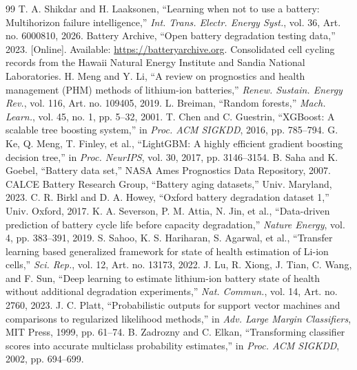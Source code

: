 \raggedbottom
\begin{thebibliography}{99}
 T. A. Shikdar and H. Laaksonen, ``Learning when not to use a battery: Multihorizon failure intelligence,'' \emph{Int. Trans. Electr. Energy Syst.}, vol. 36, Art. no. 6000810, 2026.
 Battery Archive, ``Open battery degradation testing data,'' 2023. [Online]. Available: \url{https://batteryarchive.org}. Consolidated cell cycling records from the Hawaii Natural Energy Institute and Sandia National Laboratories.
 H. Meng and Y. Li, ``A review on prognostics and health management (PHM) methods of lithium-ion batteries,'' \emph{Renew. Sustain. Energy Rev.}, vol. 116, Art. no. 109405, 2019.
 L. Breiman, ``Random forests,'' \emph{Mach. Learn.}, vol. 45, no. 1, pp. 5--32, 2001.
 T. Chen and C. Guestrin, ``XGBoost: A scalable tree boosting system,'' in \emph{Proc. ACM SIGKDD}, 2016, pp. 785--794.
 G. Ke, Q. Meng, T. Finley, et al., ``LightGBM: A highly efficient gradient boosting decision tree,'' in \emph{Proc. NeurIPS}, vol. 30, 2017, pp. 3146--3154.
 B. Saha and K. Goebel, ``Battery data set,'' NASA Ames Prognostics Data Repository, 2007.
 CALCE Battery Research Group, ``Battery aging datasets,'' Univ. Maryland, 2023.
 C. R. Birkl and D. A. Howey, ``Oxford battery degradation dataset 1,'' Univ. Oxford, 2017.
 K. A. Severson, P. M. Attia, N. Jin, et al., ``Data-driven prediction of battery cycle life before capacity degradation,'' \emph{Nature Energy}, vol. 4, pp. 383--391, 2019.
 S. Sahoo, K. S. Hariharan, S. Agarwal, et al., ``Transfer learning based generalized framework for state of health estimation of Li-ion cells,'' \emph{Sci. Rep.}, vol. 12, Art. no. 13173, 2022.
 J. Lu, R. Xiong, J. Tian, C. Wang, and F. Sun, ``Deep learning to estimate lithium-ion battery state of health without additional degradation experiments,'' \emph{Nat. Commun.}, vol. 14, Art. no. 2760, 2023.
 J. C. Platt, ``Probabilistic outputs for support vector machines and comparisons to regularized likelihood methods,'' in \emph{Adv. Large Margin Classifiers}, MIT Press, 1999, pp. 61--74.
 B. Zadrozny and C. Elkan, ``Transforming classifier scores into accurate multiclass probability estimates,'' in \emph{Proc. ACM SIGKDD}, 2002, pp. 694--699.

\end{thebibliography}

